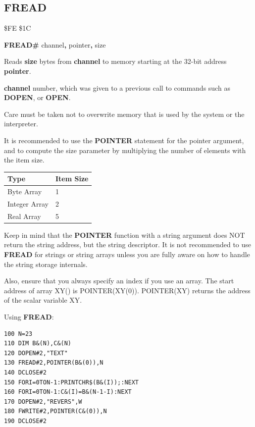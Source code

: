
\newpage
\subsection{FREAD}
\begin{description}[leftmargin=2cm,style=nextline]
\item [Token:] \$FE \$1C
\item [Format:] {\bf FREAD\#} channel{\bf,} pointer{\bf,} size
\item [Usage:] Reads {\bf size} bytes from {\bf channel} to memory
               starting at the 32-bit address {\bf pointer}.

               {\bf channel} number, which was given to a previous
               call to commands such as {\bf DOPEN}, or {\bf OPEN}.


               Care must be taken not to overwrite memory
               that is used by the system or the interpreter.

               It is recommended to use the {\bf POINTER} statement
               for the pointer argument, and to compute the size parameter
               by multiplying the number of elements with the item size.
\begin{center}
\label{freadtable}
\setlength{\tabcolsep}{1mm}
\begin{tabular}{|l|l|}
\hline
{\bf Type}          & {\bf Item Size} \\
\hline
Byte     Array &  1     \\
Integer  Array &  2     \\
Real     Array &  5     \\
\hline
\end{tabular}
\end{center}

Keep in mind that the {\bf POINTER} function with a string argument
does NOT return the string address, but the string descriptor.
It is not recommended to use {\bf FREAD} for strings or string arrays
unless you are fully aware on how to handle the string storage internals.

Also, ensure that you always specify an index if you use an array.
The start address of array XY() is POINTER(XY(0)).
POINTER(XY) returns the address of the scalar variable XY.

\item [Example:] Using {\bf FREAD}:
\begin{tcolorbox}[colback=black,coltext=white]
\verbatimfont{\codefont}
\begin{verbatim}
100 N=23
110 DIM B&(N),C&(N)
120 DOPEN#2,"TEXT"
130 FREAD#2,POINTER(B&(0)),N
140 DCLOSE#2
150 FORI=0TON-1:PRINTCHR$(B&(I));:NEXT
160 FORI=0TON-1:C&(I)=B&(N-1-I):NEXT
170 DOPEN#2,"REVERS",W
180 FWRITE#2,POINTER(C&(0)),N
190 DCLOSE#2
\end{verbatim}
\end{tcolorbox}
\end{description}

